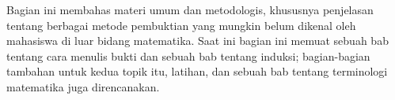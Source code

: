 \documentclass[../../include/open-logic-part]{subfiles}
\begin{document}

\begin{editorial}
  Bagian ini membahas materi umum dan metodologis, khususnya
  penjelasan tentang berbagai metode pembuktian yang mungkin belum
  dikenal oleh mahasiswa di luar bidang matematika. Saat ini bagian
  ini memuat sebuah bab tentang cara menulis bukti dan sebuah bab
  tentang induksi; bagian-bagian tambahan untuk kedua topik itu,
  latihan, dan sebuah bab tentang terminologi matematika juga
  direncanakan.
\end{editorial}



\OLEndPartHook
\end{document}
